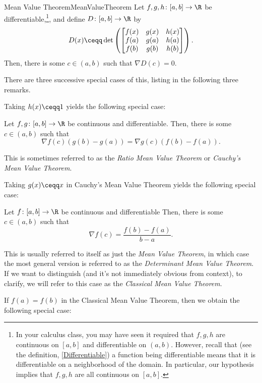 \begin{thm}{Mean Value Theorem}{MeanValueTheorem}
Let $f,g,h\colon [a,b]\rightarrow \R$ be differentiable,\footnote{In your calculus class, you may have seen it required that $f,g,h$ are continuous on $[a,b]$ and differentiable on $(a,b)$.  However, recall that (see the definition, \cref{Differentiable}) a function being differentiable means that it is differentiable on a neighborhood of the domain.  In particular, our hypothesis implies that $f,g,h$ are all continuous on $[a,b]$.}, and define $D\colon [a,b]\rightarrow \R$ by
\begin{equation}
D(x)\ceqq \det \left( \begin{bmatrix}f(x) & g(x) & h(x) \\ f(a) & g(a) & h(a) \\ f(b) & g(b) & h(b)\end{bmatrix}\right) .
\end{equation}
Then, there is some $c\in (a,b)$ such that $\nabla D(c)=0$.
\begin{rmk}
There are three successive special cases of this, listing in the following three remarks.
\end{rmk}
\begin{rmk}
Taking $h(x)\ceqq 1$ yields the following special case:

Let $f,g\colon [a,b]\rightarrow \R$ be continuous and differentiable.  Then, there is some $c\in (a,b)$ such that
\begin{equation}\label{eqn6.4.16}
\nabla f(c)(g(b)-g(a))=\nabla g(c)(f(b)-f(a)).
\end{equation}

This is sometimes referred to as the \emph{Ratio Mean Value Theorem} or \emph{Cauchy's Mean Value Theorem}.
\end{rmk}
\begin{rmk}
Taking $g(x)\ceqq x$ in Cauchy's Mean Value Theorem yields the following special case:

Let $f\colon [a,b]\rightarrow \R$ be continuous and differentiable  Then, there is some $c\in (a,b)$ such that
\begin{equation}\label{eqn6.4.17}
\nabla f(c)=\frac{f(b)-f(a)}{b-a}.
\end{equation}

This is usually referred to itself as just the \emph{Mean Value Theorem}, in which case the most general version is referred to as the \emph{Determinant Mean Value Theorem}.  If we want to distinguish (and it's not immediately obvious from context), to clarify, we will refer to this case as the \emph{Classical Mean Value Theorem}.
\end{rmk}
\begin{rmk}
If $f(a)=f(b)$ in the Classical Mean Value Theorem, then we obtain the following special case:


\end{rmk}
\end{thm}
